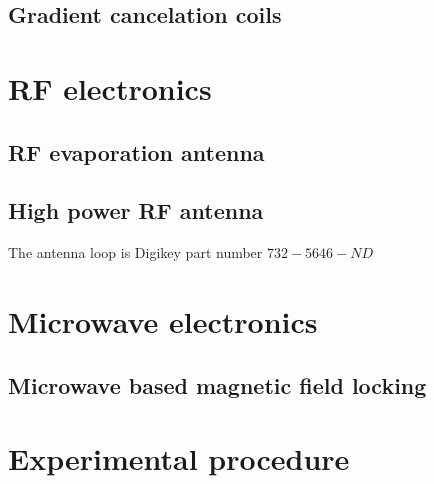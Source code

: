 \subsection{Gradient cancelation coils}

\section{RF electronics}
\subsection{RF evaporation antenna}
\subsection{High power RF antenna}
The antenna loop is Digikey part number $732-5646-ND$

\section{Microwave electronics}

\subsection{Microwave based magnetic field locking}

\section{Experimental procedure}

